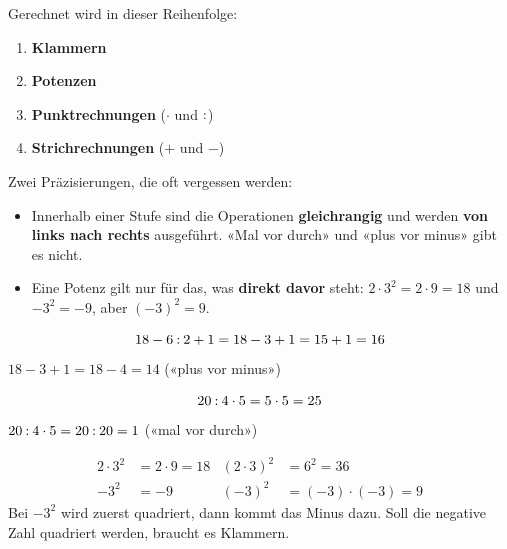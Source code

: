\documentclass[11pt]{exam}
\begin{document}

\begin{merke}
Gerechnet wird in dieser Reihenfolge:
\begin{enumerate}
  \item \textbf{Klammern}
  \item \textbf{Potenzen}
  \item \textbf{Punktrechnungen} ($\cdot$ und $\mathbin{:}$)
  \item \textbf{Strichrechnungen} ($+$ und $-$)
\end{enumerate}
Zwei Präzisierungen, die oft vergessen werden:
\begin{itemize}
  \item Innerhalb einer Stufe sind die Operationen \textbf{gleichrangig} und
        werden \textbf{von links nach rechts} ausgeführt. «Mal vor durch» und
        «plus vor minus» gibt es nicht.
  \item Eine Potenz gilt nur für das, was \textbf{direkt davor} steht:
        $2 \cdot 3^2 = 2 \cdot 9 = 18$ \quad und \quad $-3^2 = -9$,
        aber \quad $(-3)^2 = 9$.
\end{itemize}
\end{merke}


\begin{beispiel}
\[ 18 - 6 \mathbin{:} 2 + 1 = 18 - 3 + 1 = 15 + 1 = 16 \]
\falsch\quad $18 - 3 + 1 = 18 - 4 = 14$ \quad («plus vor minus»)
\end{beispiel}

\begin{beispiel}
\[ 20 \mathbin{:} 4 \cdot 5 = 5 \cdot 5 = 25 \]
\falsch\quad $20 \mathbin{:} 4 \cdot 5 = 20 \mathbin{:} 20 = 1$ \quad
(«mal vor durch»)
\end{beispiel}

\begin{beispiel}[3: Potenzen]
\begin{align*}
  2 \cdot 3^2    &= 2 \cdot 9 = 18 & (2 \cdot 3)^2 &= 6^2 = 36 \\
  -3^2           &= -9             & (-3)^2        &= (-3) \cdot (-3) = 9
\end{align*}
Bei $-3^2$ wird zuerst quadriert, dann kommt das Minus dazu. Soll die negative
Zahl quadriert werden, braucht es Klammern.
\end{beispiel}
\end{document}
